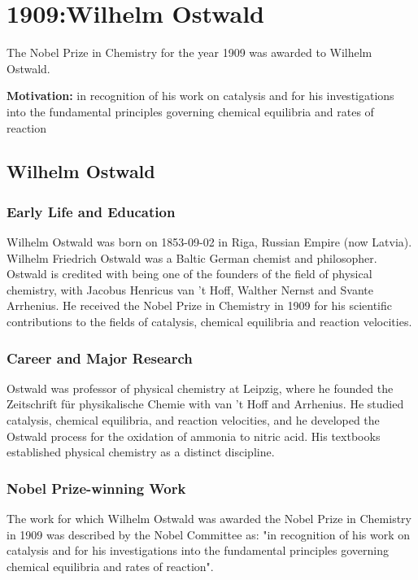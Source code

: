 \chapter{1909:Wilhelm Ostwald}
\label{chap:chemistry1909}

The Nobel Prize in Chemistry for the year 1909 was awarded to Wilhelm Ostwald.

\textbf{Motivation:}
in recognition of his work on catalysis and for his investigations into the fundamental principles governing chemical equilibria and rates of reaction

\section{Wilhelm Ostwald}

\subsection*{Early Life and Education}

Wilhelm Ostwald was born on 1853-09-02 in Riga, Russian Empire (now Latvia).
Wilhelm Friedrich Ostwald was a Baltic German chemist and philosopher. Ostwald is credited with being one of the founders of the field of physical chemistry, with Jacobus Henricus van 't Hoff, Walther Nernst and Svante Arrhenius.
He received the Nobel Prize in Chemistry in 1909 for his scientific contributions to the fields of catalysis, chemical equilibria and reaction velocities.

\subsection*{Career and Major Research}

Ostwald was professor of physical chemistry at Leipzig, where he founded the Zeitschrift für physikalische Chemie with van 't Hoff and Arrhenius. He studied catalysis, chemical equilibria, and reaction velocities, and he developed the Ostwald process for the oxidation of ammonia to nitric acid. His textbooks established physical chemistry as a distinct discipline.

\subsection*{Nobel Prize-winning Work}

The work for which Wilhelm Ostwald was awarded the Nobel Prize in Chemistry in 1909 was described by the Nobel Committee as: "in recognition of his work on catalysis and for his investigations into the fundamental principles governing chemical equilibria and rates of reaction".

